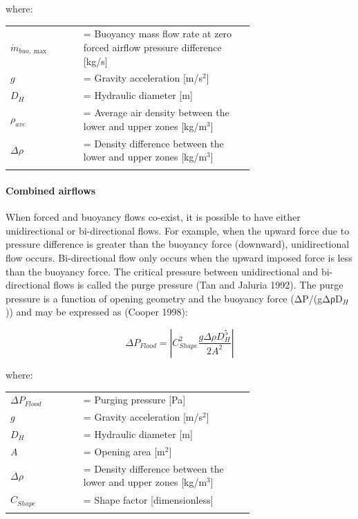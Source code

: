 where:

\begin{tabular}{lp{0.7\linewidth}}
\\
$\dot{m}_{buo,\max}$ &= Buoyancy mass flow rate at zero forced airflow pressure difference [kg/s]\\
$g$ &= Gravity acceleration [m/s\(^{2}\)]\\
$D_H$ &= Hydraulic diameter [m] \\
$\rho_{ave}$ &= Average air density between the lower and upper zones [kg/m\(^{3}\)]\\
$\Delta \rho$ &= Density difference between the lower and upper zones [kg/m\(^{3}\)]\\
\\
\end{tabular}

\paragraph{Combined airflows}\label{combined-airflows}

When forced and buoyancy flows co-exist, it is possible to have either unidirectional or bi-directional flows. For example, when the upward force due to pressure difference is greater than the buoyancy force (downward), unidirectional flow occurs. Bi-directional flow only occurs when the upward imposed force is less than the buoyancy force. The critical pressure between unidirectional and bi-directional flows is called the purge pressure (Tan and Jaluria 1992). The purge pressure is a function of opening geometry and the buoyancy force (ΔP/(gΔρD\(_{H}\))) and may be expressed as (Cooper 1998):

\begin{equation}
\Delta {P_{Flood}} = \left| {C_{Shape}^2\frac{{g\Delta \rho D_H^5}}{{2{A^2}}}} \right|
\end{equation}

where:

\begin{tabular}{lp{0.7\linewidth}}
\\
$\Delta P_{Flood}$ &= Purging pressure [Pa]\\
$g$ &= Gravity acceleration [m/s\(^{2}\)]\\
$D_H$ &= Hydraulic diameter [m]\\
$A$ &= Opening area [m\(^{2}\)]\\
$\Delta \rho$ &= Density difference between the lower and upper zones [kg/m\(^{3}\)]\\
$C_{Shape}$ &= Shape factor [dimensionless]\\
\\
\end{tabular}

